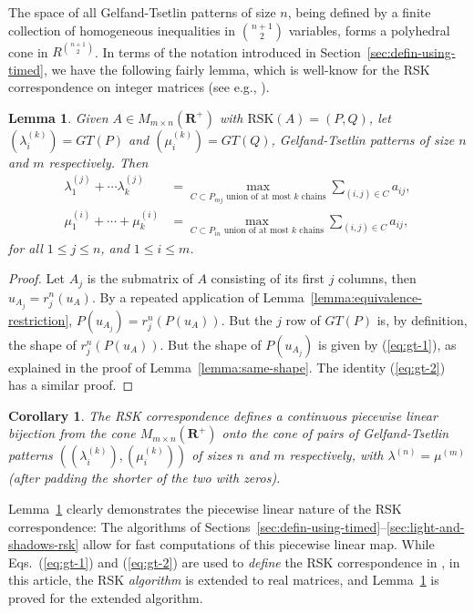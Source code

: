 \documentclass[10pt]{amsproc}
\newtheorem{lemma}[theorem]{Lemma}
\newtheorem{corollary}[theorem]{Corollary}
\theoremstyle{definition}
\theoremstyle{remark}
\newcommand{\rp}{\mathbf{R}^+}
\newcommand{\rsk}{\mathrm{RSK}}
\begin{document}
The space of all Gelfand-Tsetlin patterns of size $n$, being defined by a finite collection of homogeneous inequalities in $\binom{n+1}2$ variables, forms a polyhedral cone in $R^{\binom{n+1}2}$.
In terms of the notation introduced in Section~\ref{sec:defin-using-timed}, we have the following fairly lemma, which is well-know for the RSK correspondence on integer matrices (see e.g., \cite[Prop.~2.26]{kir-trop}).
\begin{lemma}
  \label{lemma:pl}
  Given $A\in M_{m\times n}(\rp)$ with $\rsk(A)=(P,Q)$, let $(\lambda^{(k)}_i)=GT(P)$ and $(\mu^{(k)}_i)=GT(Q)$, Gelfand-Tsetlin patterns of size $n$ and $m$ respectively.
  Then
  \begin{align}
    \label{eq:gt-1}
    \lambda^{(j)}_1 + \dotsb \lambda_k^{(j)} & = \max_{C\subset P_{mj}\text{ union of at most $k$ chains}} \sum_{(i,j)\in C} a_{ij},\\
    \label{eq:gt-2}
    \mu_1^{(i)} + \dotsb + \mu_k^{(i)} & = \max_{C\subset P_{in}\text{ union of at most $k$ chains}} \sum_{(i,j)\in C} a_{ij},
  \end{align}
  for all $1\leq j\leq n$, and $1\leq i\leq m$.
\end{lemma}
\begin{proof}
  Let $A_j$ is the submatrix of $A$ consisting of its first $j$ columns, then $u_{A_j} = r^n_j(u_A)$.
  By a repeated application of Lemma~\ref{lemma:equivalence-restriction}, $P(u_{A_j}) = r^n_j(P(u_A))$.
  But the $j$ row of $GT(P)$ is, by definition, the shape of $r^n_j(P(u_A))$.
  But the shape of $P(u_{A_j})$ is given by (\ref{eq:gt-1}), as explained in the proof of Lemma~\ref{lemma:same-shape}.
  The identity (\ref{eq:gt-2}) has a similar proof.
\end{proof}
\begin{corollary}
  The RSK correspondence defines a continuous piecewise linear bijection from the cone $M_{m\times n}(\rp)$ onto the cone of pairs of Gelfand-Tsetlin patterns $((\lambda^{(k)}_i), (\mu^{(k)}_i))$ of sizes $n$ and $m$ respectively, with $\lambda^{(n)}=\mu^{(m)}$ (after padding the shorter of the two with zeros).
\end{corollary}
Lemma~\ref{lemma:pl} clearly demonstrates the piecewise linear nature of the RSK correspondence:
The algorithms of Sections~\ref{sec:defin-using-timed}--\ref{sec:light-and-shadows-rsk} allow for fast computations of this piecewise linear map.
While Eqs.~(\ref{eq:gt-1}) and (\ref{eq:gt-2}) are used to \emph{define} the RSK correspondence in \cite{kir-trop}, in this article, the RSK \emph{algorithm} is extended to real matrices, and Lemma~\ref{lemma:pl} is proved for the extended algorithm.
\end{document}
